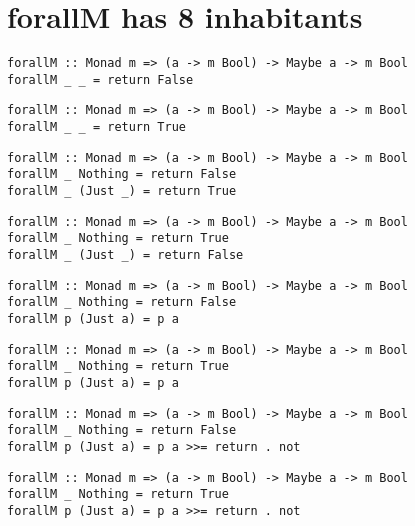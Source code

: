 \appendix
\label{forallM}
\section{forallM has 8 inhabitants}
\tiny
\begin{lstlisting}[style=haskell]
forallM :: Monad m => (a -> m Bool) -> Maybe a -> m Bool
forallM _ _ = return False
\end{lstlisting}
\begin{lstlisting}[style=haskell]
forallM :: Monad m => (a -> m Bool) -> Maybe a -> m Bool
forallM _ _ = return True
\end{lstlisting}
\begin{lstlisting}[style=haskell]
forallM :: Monad m => (a -> m Bool) -> Maybe a -> m Bool
forallM _ Nothing = return False
forallM _ (Just _) = return True
\end{lstlisting}
\begin{lstlisting}[style=haskell]
forallM :: Monad m => (a -> m Bool) -> Maybe a -> m Bool
forallM _ Nothing = return True
forallM _ (Just _) = return False
\end{lstlisting}
\begin{lstlisting}[style=haskell]
forallM :: Monad m => (a -> m Bool) -> Maybe a -> m Bool
forallM _ Nothing = return False
forallM p (Just a) = p a
\end{lstlisting}
\begin{lstlisting}[style=haskell]
forallM :: Monad m => (a -> m Bool) -> Maybe a -> m Bool
forallM _ Nothing = return True
forallM p (Just a) = p a
\end{lstlisting}
\begin{lstlisting}[style=haskell]
forallM :: Monad m => (a -> m Bool) -> Maybe a -> m Bool
forallM _ Nothing = return False
forallM p (Just a) = p a >>= return . not
\end{lstlisting}
\begin{lstlisting}[style=haskell]
forallM :: Monad m => (a -> m Bool) -> Maybe a -> m Bool
forallM _ Nothing = return True
forallM p (Just a) = p a >>= return . not
\end{lstlisting}
